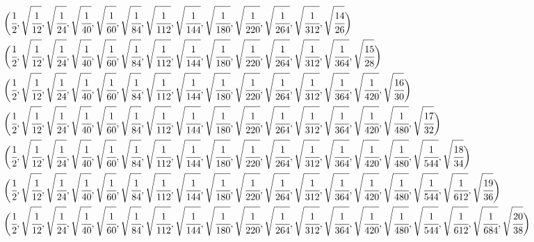 \documentclass[8pt,a4paper]{article}
\begin{document}
\begin{align*}
			\biggl(&\cfrac{1}{2} , \sqrt{\cfrac{1}{12}} , \sqrt{\cfrac{1}{24}} , \sqrt{\cfrac{1}{40}} , \sqrt{\cfrac{1}{60}} , \sqrt{\cfrac{1}{84}} , \sqrt{\cfrac{1}{112}} , \sqrt{\cfrac{1}{144}} , \sqrt{\cfrac{1}{180}} , \sqrt{\cfrac{1}{220}} , \sqrt{\cfrac{1}{264}} , \sqrt{\cfrac{1}{312}} , \sqrt{\cfrac{14}{26}}\biggl) \\
			\biggl(&\cfrac{1}{2} , \sqrt{\cfrac{1}{12}} , \sqrt{\cfrac{1}{24}} , \sqrt{\cfrac{1}{40}} , \sqrt{\cfrac{1}{60}} , \sqrt{\cfrac{1}{84}} , \sqrt{\cfrac{1}{112}} , \sqrt{\cfrac{1}{144}} , \sqrt{\cfrac{1}{180}} , \sqrt{\cfrac{1}{220}} , \sqrt{\cfrac{1}{264}} , \sqrt{\cfrac{1}{312}} , \sqrt{\cfrac{1}{364}} , \sqrt{\cfrac{15}{28}}\biggl) \\
			\biggl(&\cfrac{1}{2} , \sqrt{\cfrac{1}{12}} , \sqrt{\cfrac{1}{24}} , \sqrt{\cfrac{1}{40}} , \sqrt{\cfrac{1}{60}} , \sqrt{\cfrac{1}{84}} , \sqrt{\cfrac{1}{112}} , \sqrt{\cfrac{1}{144}} , \sqrt{\cfrac{1}{180}} , \sqrt{\cfrac{1}{220}} , \sqrt{\cfrac{1}{264}} , \sqrt{\cfrac{1}{312}} , \sqrt{\cfrac{1}{364}} , \sqrt{\cfrac{1}{420}} , \sqrt{\cfrac{16}{30}}\biggl) \\
			\biggl(&\cfrac{1}{2} , \sqrt{\cfrac{1}{12}} , \sqrt{\cfrac{1}{24}} , \sqrt{\cfrac{1}{40}} , \sqrt{\cfrac{1}{60}} , \sqrt{\cfrac{1}{84}} , \sqrt{\cfrac{1}{112}} , \sqrt{\cfrac{1}{144}} , \sqrt{\cfrac{1}{180}} , \sqrt{\cfrac{1}{220}} , \sqrt{\cfrac{1}{264}} , \sqrt{\cfrac{1}{312}} , \sqrt{\cfrac{1}{364}} , \sqrt{\cfrac{1}{420}} , \sqrt{\cfrac{1}{480}} , \sqrt{\cfrac{17}{32}}\biggl) \\
			\biggl(&\cfrac{1}{2} , \sqrt{\cfrac{1}{12}} , \sqrt{\cfrac{1}{24}} , \sqrt{\cfrac{1}{40}} , \sqrt{\cfrac{1}{60}} , \sqrt{\cfrac{1}{84}} , \sqrt{\cfrac{1}{112}} , \sqrt{\cfrac{1}{144}} , \sqrt{\cfrac{1}{180}} , \sqrt{\cfrac{1}{220}} , \sqrt{\cfrac{1}{264}} , \sqrt{\cfrac{1}{312}} , \sqrt{\cfrac{1}{364}} , \sqrt{\cfrac{1}{420}} , \sqrt{\cfrac{1}{480}} , \sqrt{\cfrac{1}{544}} , \sqrt{\cfrac{18}{34}}\biggl) \\
			\biggl(&\cfrac{1}{2} , \sqrt{\cfrac{1}{12}} , \sqrt{\cfrac{1}{24}} , \sqrt{\cfrac{1}{40}} , \sqrt{\cfrac{1}{60}} , \sqrt{\cfrac{1}{84}} , \sqrt{\cfrac{1}{112}} , \sqrt{\cfrac{1}{144}} , \sqrt{\cfrac{1}{180}} , \sqrt{\cfrac{1}{220}} , \sqrt{\cfrac{1}{264}} , \sqrt{\cfrac{1}{312}} , \sqrt{\cfrac{1}{364}} , \sqrt{\cfrac{1}{420}} , \sqrt{\cfrac{1}{480}} , \sqrt{\cfrac{1}{544}} , \sqrt{\cfrac{1}{612}} , \sqrt{\cfrac{19}{36}}\biggl) \\
			\biggl(&\cfrac{1}{2} , \sqrt{\cfrac{1}{12}} , \sqrt{\cfrac{1}{24}} , \sqrt{\cfrac{1}{40}} , \sqrt{\cfrac{1}{60}} , \sqrt{\cfrac{1}{84}} , \sqrt{\cfrac{1}{112}} , \sqrt{\cfrac{1}{144}} , \sqrt{\cfrac{1}{180}} , \sqrt{\cfrac{1}{220}} , \sqrt{\cfrac{1}{264}} , \sqrt{\cfrac{1}{312}} , \sqrt{\cfrac{1}{364}} , \sqrt{\cfrac{1}{420}} , \sqrt{\cfrac{1}{480}} , \sqrt{\cfrac{1}{544}} , \sqrt{\cfrac{1}{612}} , \sqrt{\cfrac{1}{684}} , \sqrt{\cfrac{20}{38}}\biggl) \\

\end{align*}
\end{document}
